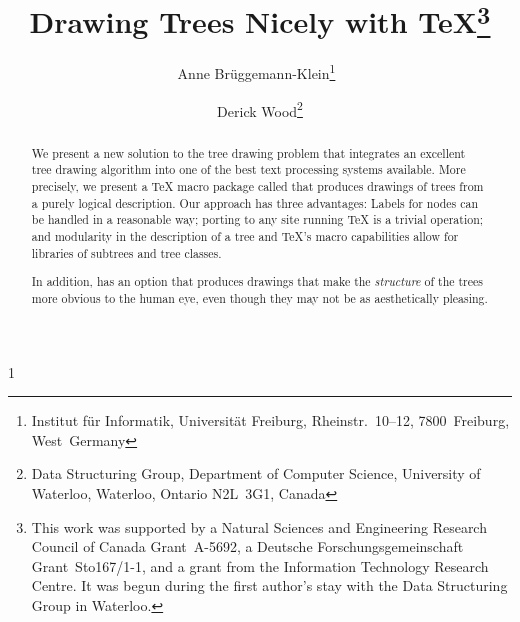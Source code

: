 \def\enode{\node{\external\type{dot}}}
\def\inode{\node{\type{dot}}}

\def\e{\node{\external\type{dot}}}
\def\i{\node{\type{dot}}}
\def\il{\node{\type{dot}\leftonly}}
\def\ir{\node{\type{dot}\rightonly}}

\newcommand{\stack}[3]{%
     \vtop{\settowidth{\hsize}{#1}%
     \setlength{\leftskip}{0pt plus 1fill}%
     \setlength{\baselineskip}{#2}#3}}

\let\multic\multicolumn

\newlength{\hd} %
\hbox{1}
\newcommand{\ds}{\hspace{\hd}} %

\newcommand{\ccol}[1]{\multicolumn{1}{c}{#1}}






\title{Drawing Trees Nicely with \TeX\thanks{This work was supported by
     a Natural Sciences and Engineering Research Council of Canada
     Grant~A-5692, a Deutsche Forschungsgemeinschaft Grant~Sto167/1-1,
     and a grant from the Information Technology Research  Centre.
     It was begun during the first author's stay with
     the Data Structuring Group in Waterloo.}}
\author{Anne Br\"uggemann-Klein\thanks{Institut f\"ur Informatik,
     Universit\"at Freiburg, Rheinstr.~10--12, 7800~Freiburg,
     West~Germany}\ \and Derick Wood\thanks{Data
     Structuring Group, Department of Computer Science, University of
     Waterloo, Waterloo, Ontario N2L~3G1, Canada}}
\date{}
\maketitle

\begin{abstract}

We present a new solution to the tree drawing problem that
integrates an excellent tree drawing algorithm into one of the best text
processing systems available. More precisely, we present a \TeX{} macro package
called \TreeTeX{} that produces drawings of trees from a purely logical
description. Our approach has three advantages: Labels
for nodes can be handled in a reasonable way; porting
\TreeTeX{} to any site running \TeX{} is a trivial operation; and
modularity in the description of a tree and \TeX{}'s macro capabilities
allow for libraries of subtrees and tree classes.

In addition, \TreeTeX{} has an option that produces
drawings that make the
\emph{structure} of the trees more obvious to the human eye,
even though they may not be as aesthetically pleasing.

\end{abstract}

